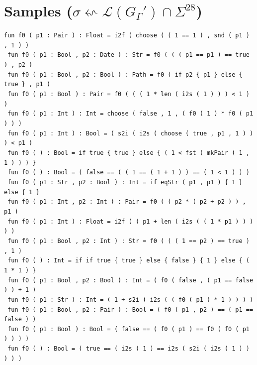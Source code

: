 \documentclass[sigplan,nonacm]{acmart}\settopmatter{printfolios=false,printccs=false,printacmref=false}
\begin{document}
  \section{Samples ($\sigma \leftsquigarrow \mathcal{L}(G_\Gamma') \cap \Sigma^{28}$)}
\vspace{0.3cm}
\begin{tiny}
  \texttt{fun f0 ( p1 : Pair ) : Float = i2f ( choose ( ( 1 == 1 ) , snd ( p1 ) , 1 ) )}\\
  \texttt{ fun f0 ( p1 : Bool , p2 : Date ) : Str = f0 ( ( ( p1 == p1 ) == true ) , p2 )}\\
  \texttt{ fun f0 ( p1 : Bool , p2 : Bool ) : Path = f0 ( if p2 \{ p1 \} else \{ true \} , p1 )}\\
  \texttt{ fun f0 ( p1 : Bool ) : Pair = f0 ( ( ( 1 * len ( i2s ( 1 ) ) ) < 1 ) )}\\
  \texttt{ fun f0 ( p1 : Int ) : Int = choose ( false , 1 , ( f0 ( 1 ) * f0 ( p1 ) ) )}\\
  \texttt{ fun f0 ( p1 : Int ) : Bool = ( s2i ( i2s ( choose ( true , p1 , 1 ) ) ) < p1 )}\\
  \texttt{ fun f0 ( ) : Bool = if true \{ true \} else \{ ( 1 < fst ( mkPair ( 1 , 1 ) ) ) \}}\\
  \texttt{ fun f0 ( ) : Bool = ( false == ( ( 1 == ( 1 + 1 ) ) == ( 1 < 1 ) ) )}\\
  \texttt{ fun f0 ( p1 : Str , p2 : Bool ) : Int = if eqStr ( p1 , p1 ) \{ 1 \} else \{ 1 \}}\\
  \texttt{ fun f0 ( p1 : Int , p2 : Int ) : Pair = f0 ( ( p2 * ( p2 + p2 ) ) , p1 )}\\
  \texttt{ fun f0 ( p1 : Int ) : Float = i2f ( ( p1 + len ( i2s ( ( 1 * p1 ) ) ) ) )}\\
  \texttt{ fun f0 ( p1 : Bool , p2 : Int ) : Str = f0 ( ( ( 1 == p2 ) == true ) , 1 )}\\
  \texttt{ fun f0 ( ) : Int = if if true \{ true \} else \{ false \} \{ 1 \} else \{ ( 1 * 1 ) \}}\\
  \texttt{ fun f0 ( p1 : Bool , p2 : Bool ) : Int = ( f0 ( false , ( p1 == false ) ) + 1 )}\\
  \texttt{ fun f0 ( p1 : Str ) : Int = ( 1 + s2i ( i2s ( ( f0 ( p1 ) * 1 ) ) ) )}\\
  \texttt{ fun f0 ( p1 : Bool , p2 : Pair ) : Bool = ( f0 ( p1 , p2 ) == ( p1 == false ) )}\\
  \texttt{ fun f0 ( p1 : Bool ) : Bool = ( false == ( f0 ( p1 ) == f0 ( f0 ( p1 ) ) ) )}\\
  \texttt{ fun f0 ( ) : Bool = ( true == ( i2s ( 1 ) == i2s ( s2i ( i2s ( 1 ) ) ) ) )}\\

\end{tiny}
\end{document}
